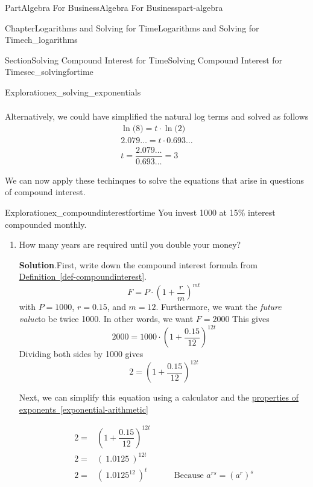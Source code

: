 \documentclass[oneside,10pt,]{tufte-book}
\newcommand{\blocktitlefont}{\relax}
\newcommand{\xreffont}{\relax}
\numberwithin{equation}{chapter}
\newcommand{\amp}{&}
\begin{document}
\begin{partptx}{Part}{Algebra For Business}{}{Algebra For Business}{}{}{part-algebra}
\begin{chapterptx}{Chapter}{Logarithms and Solving for Time}{}{Logarithms and Solving for Time}{}{}{ch_logarithms}
\begin{sectionptx}{Section}{Solving Compound Interest for Time}{}{Solving Compound Interest for Time}{}{}{sec_solvingfortime}
\begin{exploration}{Exploration}{}{ex_solving_exponentials}
\begin{enumerate}[font=\bfseries,label=(\alph*),ref=\alph*]
\begin{align*}
\end{align*}
Alternatively, we could have simplified the natural log terms and solved as follows%
\begin{gather*}
\ln\Big(8\Big) = t\cdot \ln\Big(2\Big) \\
2.079{\dots}= t\cdot {0.693\dots} \\
t =  \dfrac{2.079{\dots}}{0.693\dots} = 3
\end{gather*}
%
\end{enumerate}%
\end{exploration}%
We can now apply these techinques to solve the equations that arise in questions of compound interest.%
\begin{exploration}{Exploration}{}{ex_compoundinterestfortime}%
You invest \textdollar{}1000 at 15\% interest compounded monthly.%
\begin{enumerate}[font=\bfseries,label=(\alph*),ref=\alph*]%
\item{}How many years are required until you double your money?%
\par\smallskip%
\noindent\textbf{\blocktitlefont Solution}.\hypertarget{ex_compoundinterestfortime-2-2}{}\quad{}First, write down the compound interest formula from  \hyperref[def-compoundinterest]{Definition~{\xreffont\ref{def-compoundinterest}}}.%
\begin{equation*}
F = P\cdot \left(1 + \frac{r}{m}\right)^{mt}
\end{equation*}
with \(P=1000\), \(r=0.15\), and \(m=12\). Furthermore, we want the \emph{future value}to be twice 1000.  In other words, we want \(F=2000\) This gives%
\begin{equation*}
2000 = 1000 \cdot \left(1 + \dfrac{0.15}{12}\right)^{12t}
\end{equation*}
Dividing both sides by 1000 gives%
\begin{equation*}
2 = \left(1 + \dfrac{0.15}{12}\right)^{12t}
\end{equation*}
%
\par
Next, we can simplify this equation using a calculator and the \hyperref[exponential-arithmetic]{properties of exponents~{\xreffont\ref{exponential-arithmetic}}}%
\par
%
\begin{align*}
2 = \amp \left(1 + \dfrac{0.15}{12}\right)^{12t} \amp \\
2 = \amp \left(\ 1.0125\ \right)^{12t} \amp \\
2 = \amp \left(\ 1.0125^{12}\ \right)^{t} \amp \qquad\text{Because } a^{rs}=(a^r)^s\\

\end{align*}
\end{enumerate}
\end{exploration}
\end{sectionptx}
\end{chapterptx}
\end{partptx}
\end{document}
